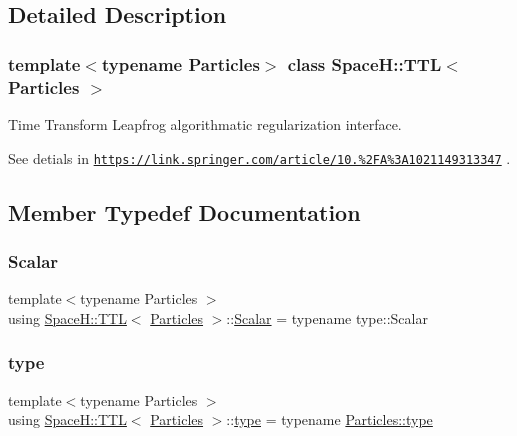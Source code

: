 \subsection{Detailed Description}
\subsubsection*{template$<$typename Particles$>$\newline
class Space\+H\+::\+T\+T\+L$<$ Particles $>$}

Time Transform Leapfrog algorithmatic regularization interface. 

See detials in \href{https://link.springer.com/article/10.1023%2FA%3A1021149313347}{\tt https\+://link.\+springer.\+com/article/10.\+1023\%2\+F\+A\%3\+A1021149313347} . 

\subsection{Member Typedef Documentation}
\mbox{\label{class_space_h_1_1_t_t_l_a8d0bb489470e6da1bcaf70a9eb38d96d}} 
\subsubsection{\texorpdfstring{Scalar}{Scalar}}
{\footnotesize\ttfamily template$<$typename Particles $>$ \\
using \mbox{\hyperlink{class_space_h_1_1_t_t_l}{Space\+H\+::\+T\+TL}}$<$ \mbox{\hyperlink{struct_space_h_1_1_particles}{Particles}} $>$\+::\mbox{\hyperlink{class_space_h_1_1_t_t_l_a8d0bb489470e6da1bcaf70a9eb38d96d}{Scalar}} =  typename type\+::\+Scalar}

\mbox{\label{class_space_h_1_1_t_t_l_a51de608711eb738bb6f80447759c15f0}} 
\subsubsection{\texorpdfstring{type}{type}}
{\footnotesize\ttfamily template$<$typename Particles $>$ \\
using \mbox{\hyperlink{class_space_h_1_1_t_t_l}{Space\+H\+::\+T\+TL}}$<$ \mbox{\hyperlink{struct_space_h_1_1_particles}{Particles}} $>$\+::\mbox{\hyperlink{class_space_h_1_1_t_t_l_a51de608711eb738bb6f80447759c15f0}{type}} =  typename \mbox{\hyperlink{class_space_h_1_1_vel_indep_particles_a09aa167b5fb1b203ab021220601ed74c}{Particles\+::type}}}



